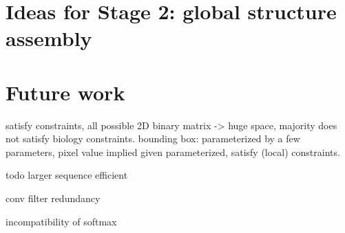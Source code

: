 \documentclass[12pt]{article}
\begin{document}
\section{Ideas for Stage 2: global structure assembly}


\section{Future work}

satisfy constraints,
all possible 2D binary matrix -> huge space, majority does not satisfy biology constraints.
bounding box: parameterized by a few parameters,
pixel value implied given parameterized, satisfy (local) constraints.



todo larger sequence efficient

conv filter redundancy

incompatibility of softmax

%
%
\end{document}

